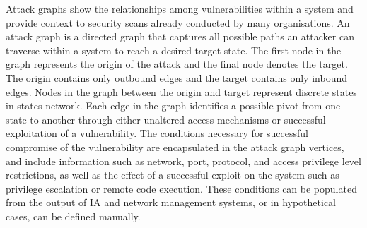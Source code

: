 Attack graphs show the relationships among vulnerabilities within a system and provide context to security scans already conducted by many organisations. An attack graph is a directed graph that captures all possible paths an attacker can traverse within a system to reach a desired target state. The first node in the graph represents the origin of the attack and the final node denotes the target. The origin contains only outbound edges and the target contains only inbound edges. Nodes in the graph between the origin and target represent discrete states in states network. Each edge in the graph identifies a possible pivot from one state to another through either unaltered access mechanisms or successful exploitation of a vulnerability. The conditions necessary for successful compromise of the vulnerability are encapsulated in the attack graph vertices, and include information such as network, port, protocol, and access privilege level restrictions, as well as the effect of a successful exploit on the system such as privilege escalation or remote code execution. These conditions can be populated from the output of IA and network management systems, or in hypothetical cases, can be defined manually.  